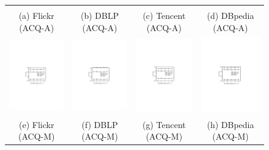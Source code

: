 \begin{figure}[htb]
\begin{tabular}{c c c c}
\begin{minipage}{3.325cm}
  \end{minipage}
  \\
  \small (a) Flickr (ACQ-A)
  &
  \small (b) DBLP (ACQ-A)
  &
  \small (c) Tencent (ACQ-A)
  &
  \small (d) DBpedia (ACQ-A)
      \\
  \begin{minipage}{3.325cm}
  \includegraphics[width=3.725cm]{figures/flickrv2}
  \end{minipage}
  &
  \begin{minipage}{3.325cm}
  \includegraphics[width=3.725cm]{figures/dblpv2}
  \end{minipage}
  &
  \begin{minipage}{3.325cm}
  \includegraphics[width=3.725cm]{figures/tencentv2}
  \end{minipage}
  &
  \begin{minipage}{3.325cm}
  \includegraphics[width=3.725cm]{figures/dbpediav2}
  \end{minipage}
  \\
  \small (e) Flickr (ACQ-M)
  &
  \small (f) DBLP (ACQ-M)
  &
  \small (g) Tencent (ACQ-M)
  &
  \small (h) DBpedia (ACQ-M)
\\



\end{tabular}
\end{figure}
